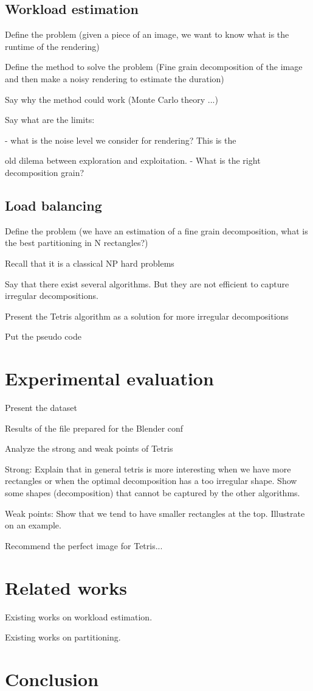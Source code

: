 \documentclass[10pt, conference, compsocconf]{IEEEtran}
\begin{document}
\subsection{Workload estimation}

Define the problem (given a piece of an image, we want to know what is the runtime of the rendering)

Define the method to solve the problem (Fine grain decomposition of the image and then 
make a noisy rendering to estimate the duration)

Say why the method could work (Monte Carlo theory ...)

Say what are the limits: 

 - what is the noise level we consider for rendering? This is the 

old dilema between exploration and exploitation.
 - What is the right decomposition grain?


\subsection{Load balancing}

Define the problem (we have an estimation of a fine grain decomposition, what is the best 
partitioning in N rectangles?)

Recall that it is a classical NP hard problems

Say that there exist several algorithms. But they are not efficient to capture irregular decompositions.

Present the Tetris algorithm as a solution for more irregular decompositions

Put the pseudo code

\section{Experimental evaluation} \label{Experimental}

Present the dataset

Results of the file prepared for the Blender conf

Analyze the strong and weak points of Tetris

Strong: 
Explain that in general tetris is more interesting when we have more rectangles 
or when the optimal decomposition has a too irregular shape.
 Show some shapes (decomposition) that cannot be captured by the other algorithms. 

Weak points: Show that we tend to have smaller rectangles at the top.
Illustrate on an example.

Recommend the perfect image for Tetris...


\section{Related works} \label{RelatedWorks}

Existing works on workload estimation.

Existing works on partitioning.

\section{Conclusion} \label{Conclusion}


\def\IEEEbibitemsep{.1pt}


\end{document}
